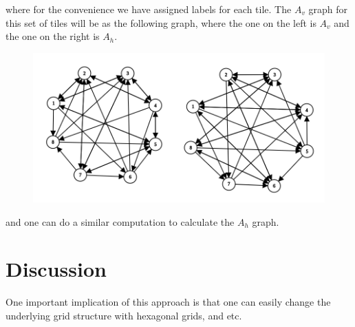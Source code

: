 \documentclass[11pt,a4paper]{article}
\theoremstyle{definition}
\theoremstyle{remark}
\theoremstyle{definition}
\begin{document}
	where for the convenience we have assigned labels for each tile. The $ A_v $ graph for this set of tiles will be as the following graph, where the one on the left is $ A_v $ and the one on the right is $ A_h $.
	
	\begin{figure}[h!]
		\centering
		\includegraphics[width=0.5\linewidth]{images/A_vA_hwithRotation.png}
		\label{fig:graph}
	\end{figure}
	
	\FloatBarrier
	
	and one can do a similar computation to calculate the $ A_h $ graph.
	
	
	
	
	
	\section{Discussion}
	One important implication of this approach is that one can easily change the underlying grid structure with hexagonal grids, and etc.
	
	
	
\end{document}
